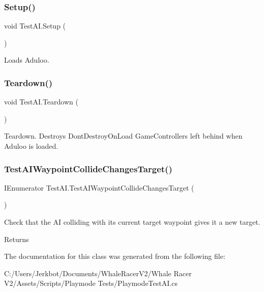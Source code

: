 \mbox{\label{class_test_a_i_a75293e26155661268ce3760bc9d391e1}} 
\subsubsection{\texorpdfstring{Setup()}{Setup()}}
{\footnotesize\ttfamily void Test\+A\+I.\+Setup (\begin{DoxyParamCaption}{ }\end{DoxyParamCaption})}



Loads Aduloo. 

\mbox{\label{class_test_a_i_a8aaa5d3fb6588e052776e3f47dfb0e9a}} 
\subsubsection{\texorpdfstring{Teardown()}{Teardown()}}
{\footnotesize\ttfamily void Test\+A\+I.\+Teardown (\begin{DoxyParamCaption}{ }\end{DoxyParamCaption})}



Teardown. Destroys Dont\+Destroy\+On\+Load Game\+Controllers left behind when Aduloo is loaded. 

\mbox{\label{class_test_a_i_a758bb47638d55186c1fba8128c5ef8c2}} 
\subsubsection{\texorpdfstring{Test\+A\+I\+Waypoint\+Collide\+Changes\+Target()}{TestAIWaypointCollideChangesTarget()}}
{\footnotesize\ttfamily I\+Enumerator Test\+A\+I.\+Test\+A\+I\+Waypoint\+Collide\+Changes\+Target (\begin{DoxyParamCaption}{ }\end{DoxyParamCaption})}



Check that the AI colliding with its current target waypoint gives it a new target. 

\begin{DoxyReturn}{Returns}

\end{DoxyReturn}


The documentation for this class was generated from the following file\+:\begin{DoxyCompactItemize}
\item 
C\+:/\+Users/\+Jerkbot/\+Documents/\+Whale\+Racer\+V2/\+Whale Racer V2/\+Assets/\+Scripts/\+Playmode Tests/Playmode\+Test\+A\+I.\+cs\end{DoxyCompactItemize}
